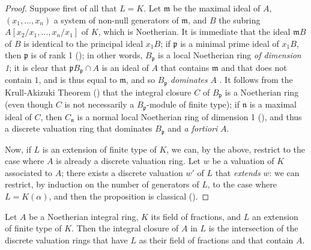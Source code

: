\begin{proof}
\label{proof-II.7.1.7}
Suppose first of all that $L=K$.
Let $\mathfrak{m}$ be the maximal ideal of $A$, $(x_1,\ldots,x_n)$ a system of non-null generators of $\mathfrak{m}$, and $B$ the subring $A[x_2/x_1,\ldots,x_n/x_1]$ of $K$, which is Noetherian.
It is immediate that the ideal $\mathfrak{m}B$ of $B$ is identical to the principal ideal $x_1B$;
if $\mathfrak{p}$ is a minimal prime ideal of $x_1B$, then $\mathfrak{p}$ is of rank 1 (\cite[t.~I, p.~277]{I-13});
in other words, $B_\mathfrak{p}$ is a local Noetherian ring \emph{of dimension 1};
it is clear that $\mathfrak{p}B_\mathfrak{p}\cap A$ is an ideal of $A$ that contains $\mathfrak{m}$ and that does not contain $1$, and is thus equal to $\mathfrak{m}$, and so $B_\mathfrak{p}$ \emph{dominates} $A$ .
It follows from the Krull-Akizuki Theorem (\cite[p.~293]{II-25}) that the integral closure $C$ of $B_\mathfrak{p}$ is a Noetherian ring (even though $C$ is not necessarily a $B_\mathfrak{p}$-module of finite type);
if $\mathfrak{n}$ is a maximal ideal of $C$, then $C_\mathfrak{n}$ is a normal local Noetherian ring of dimension 1 (\cite[p.~295]{II-25}), and thus a discrete valuation ring that dominates $B_\mathfrak{p}$ and \emph{a fortiori} $A$.

Now, if $L$ is an extension of finite type of $K$, we can, by the above, restrict to the case where $A$ is already a discrete valuation ring.
Let $w$ be a valuation of $K$ associated to $A$;
there exists a discrete valuation $w'$ of $L$ that \emph{extends} $w$: we can restrict, by induction on the number of generators of $L$, to the case where $L=K(\alpha)$, and then the proposition is classical (\cite[p.~106]{II-24}).
\end{proof}

\begin{corollary}[7.1.8]
\label{II.7.1.8}
Let $A$ be a Noetherian integral ring, $K$ its field of fractions, and $L$ an extension of finite type of $K$.
Then the integral closure of $A$ in $L$ is the intersection of the discrete valuation rings that have $L$ as their field of fractions and that contain $A$.
\end{corollary}

